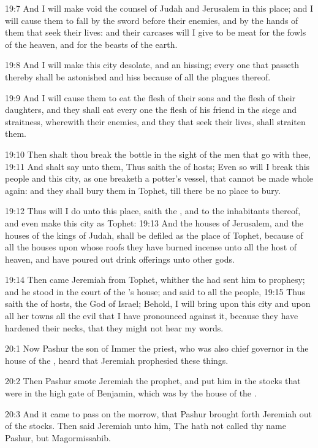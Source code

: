 19:7 And I will make void the counsel of Judah and Jerusalem in this place; and I will cause them to fall by the sword before their enemies, and by the hands of them that seek their lives: and their carcases will I give to be meat for the fowls of the heaven, and for the beasts of the earth.

19:8 And I will make this city desolate, and an hissing; every one that passeth thereby shall be astonished and hiss because of all the plagues thereof.

19:9 And I will cause them to eat the flesh of their sons and the flesh of their daughters, and they shall eat every one the flesh of his friend in the siege and straitness, wherewith their enemies, and they that seek their lives, shall straiten them.

19:10 Then shalt thou break the bottle in the sight of the men that go with thee, 19:11 And shalt say unto them, Thus saith the \LORD of hosts; Even so will I break this people and this city, as one breaketh a potter's vessel, that cannot be made whole again: and they shall bury them in Tophet, till there be no place to bury.

19:12 Thus will I do unto this place, saith the \LORD, and to the inhabitants thereof, and even make this city as Tophet: 19:13 And the houses of Jerusalem, and the houses of the kings of Judah, shall be defiled as the place of Tophet, because of all the houses upon whose roofs they have burned incense unto all the host of heaven, and have poured out drink offerings unto other gods.

19:14 Then came Jeremiah from Tophet, whither the \LORD had sent him to prophesy; and he stood in the court of the \LORD's house; and said to all the people, 19:15 Thus saith the \LORD of hosts, the God of Israel; Behold, I will bring upon this city and upon all her towns all the evil that I have pronounced against it, because they have hardened their necks, that they might not hear my words.

20:1 Now Pashur the son of Immer the priest, who was also chief governor in the house of the \LORD, heard that Jeremiah prophesied these things.

20:2 Then Pashur smote Jeremiah the prophet, and put him in the stocks that were in the high gate of Benjamin, which was by the house of the \LORD.

20:3 And it came to pass on the morrow, that Pashur brought forth Jeremiah out of the stocks. Then said Jeremiah unto him, The \LORD hath not called thy name Pashur, but Magormissabib.

